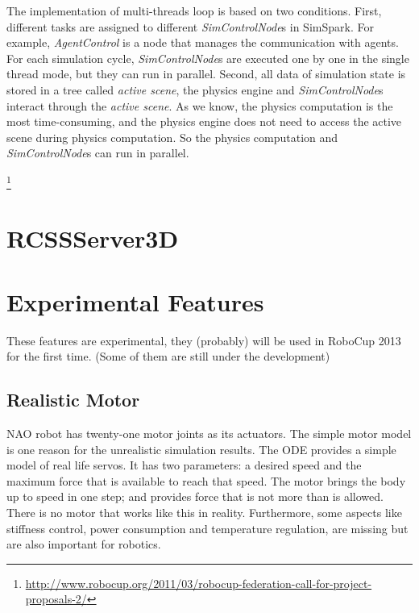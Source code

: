\documentclass{llncs}
\begin{document}
The implementation of multi-threads loop is based on two conditions.
First, different tasks are assigned to different \textit{SimControlNode}s in SimSpark.
For example, \textit{AgentControl} is a node that manages the communication with agents.
For each simulation cycle, \textit{SimControlNode}s are executed one by one in the single thread mode, but they can run in parallel.
Second, all data of simulation state is stored in a tree called \textit{active scene},
the physics engine and \textit{SimControlNode}s interact through the \textit{active scene}.
As we know, the physics computation is the most time-consuming, and the physics engine does not need to access the active scene during physics computation.
So the physics computation and \textit{SimControlNode}s can run in parallel.

\footnote{\url{http://www.robocup.org/2011/03/robocup-federation-call-for-project-proposals-2/}}



\section{RCSSServer3D}
\label{s:rcssserver3d}

\section{Experimental Features}
\label{s:ongoing}
These features are experimental, they (probably) will be used in RoboCup 2013 for the first time. (Some of them are still under the development)

\subsection{Realistic Motor}
NAO robot has twenty-one motor joints as its actuators.
The simple motor model is one reason for the unrealistic simulation results.
The ODE provides a simple model of real life servos.
It has two parameters: a desired speed and the maximum force that is available to reach that speed. The motor brings the body up to speed in one step; and provides force that is not more than is allowed.
There is no motor that works like this in reality.
Furthermore, some aspects like stiffness control, power consumption and temperature regulation, are missing but are also important for robotics.
\end{document}
